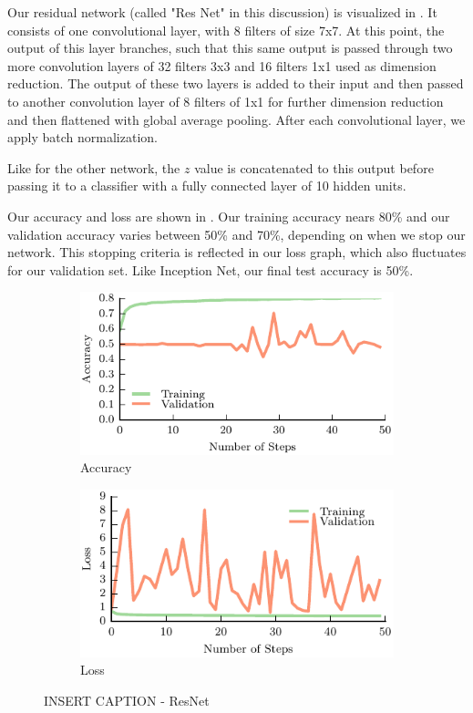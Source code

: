Our residual network (called "Res Net" in this discussion) is visualized in . 
It consists of one convolutional layer, with 8 filters of size 7x7.
At this point, the output of this layer branches, such that this same output is passed through two more convolution layers of 32 filters 3x3 and 16 filters 1x1 used as dimension reduction. 
The output of these two layers is added to their input and then passed to another convolution layer of 8 filters of 1x1 for further dimension reduction and then flattened with global average pooling. 
After each convolutional layer, we apply batch normalization. 

Like for the other network, the $z$ value is concatenated to this output before passing it to a classifier with a fully connected layer of 10 hidden units.

Our accuracy and loss are shown in . 
Our training accuracy nears 80\% and our validation accuracy varies between 50\% and 70\%, depending on when we stop our network. 
This stopping criteria is reflected in our loss graph, which also fluctuates for our validation set. 
Like Inception Net, our final test accuracy is 50\%. 

\begin{figure}[t!]
    \centering
    \begin{subfigure}[t]{0.49\textwidth}
        \includegraphics[width=0.9\columnwidth]{figs/res_net_accuracy.pdf}
        \caption{Accuracy} \label{fig:accuracy}
        \end{subfigure}
    \begin{subfigure}[t]{0.49\textwidth}
        \includegraphics[width=0.9\columnwidth]{figs/res_net_loss.pdf}
        \caption{Loss} \label{fig:loss}
    \end{subfigure}
\caption{INSERT CAPTION - ResNet} \label{fig:resnet_results}
\end{figure}

